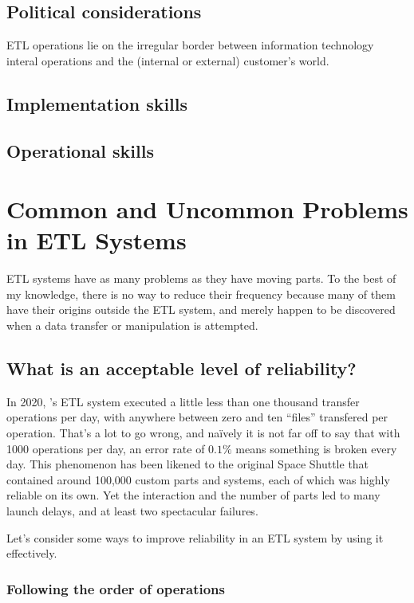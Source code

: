 \documentclass[11pt,letterpaper,twosided]{memoir}
\begin{document}
\section{Political considerations}

ETL operations lie on the irregular border between information 
technology interal operations and the (internal or external) 
customer's world. 

\section{Implementation skills}

\section{Operational skills}

\chapter{Common and Uncommon Problems in ETL Systems}

ETL systems have as many problems as they have moving parts. To the
best of my knowledge, there is no way to reduce their frequency
because many of them have their origins outside the ETL system, and
merely happen to be discovered when a data transfer or manipulation
is attempted.

\section{What is an acceptable level of reliability?}

In 2020, \UR's ETL system executed a little less than one thousand
transfer operations per day, with anywhere between zero and ten
``files'' transfered per operation. That's a lot to go wrong, and
na{\"i}vely it is not far off to say that with 1000 operations per
day, an error rate of $0.1\%$ means something is broken every day.
This phenomenon has been likened to the original Space Shuttle that
contained around 100,000 custom parts and systems, each of which
was highly reliable on its own. Yet the interaction and the number
of parts led to many launch delays, and at least two spectacular
failures.

Let's consider some ways to improve reliability in an ETL system
by using it effectively.

\subsection{Following the order of operations}
\end{document}
